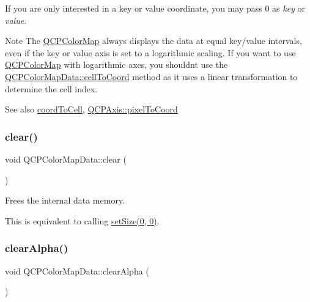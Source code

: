 If you are only interested in a key or value coordinate, you may pass 0 as {\itshape key} or {\itshape value}.

\begin{DoxyNote}{Note}
The \hyperlink{classQCPColorMap}{Q\+C\+P\+Color\+Map} always displays the data at equal key/value intervals, even if the key or value axis is set to a logarithmic scaling. If you want to use \hyperlink{classQCPColorMap}{Q\+C\+P\+Color\+Map} with logarithmic axes, you shouldn\textquotesingle{}t use the \hyperlink{classQCPColorMapData_af1a36385c78ab624cd617065602408b6}{Q\+C\+P\+Color\+Map\+Data\+::cell\+To\+Coord} method as it uses a linear transformation to determine the cell index.
\end{DoxyNote}
\begin{DoxySeeAlso}{See also}
\hyperlink{classQCPColorMapData_aca5b29e0ca2f299c9060fc6e1f74d0c8}{coord\+To\+Cell}, \hyperlink{classQCPAxis_a536ef8f624cac59b6b6fdcb495723c57}{Q\+C\+P\+Axis\+::pixel\+To\+Coord} 
\end{DoxySeeAlso}
\mbox{\label{classQCPColorMapData_a9910ba830e96955bd5c8e5bef1e77ef3}} 
\subsubsection{\texorpdfstring{clear()}{clear()}}
{\footnotesize\ttfamily void Q\+C\+P\+Color\+Map\+Data\+::clear (\begin{DoxyParamCaption}{ }\end{DoxyParamCaption})}

Frees the internal data memory.

This is equivalent to calling \hyperlink{classQCPColorMapData_a0d9ff35c299d0478b682bfbcdd9c097e}{set\+Size(0, 0)}. \mbox{\label{classQCPColorMapData_a14d08b9c3720cd719400079b86d3906b}} 
\subsubsection{\texorpdfstring{clear\+Alpha()}{clearAlpha()}}
{\footnotesize\ttfamily void Q\+C\+P\+Color\+Map\+Data\+::clear\+Alpha (\begin{DoxyParamCaption}{ }\end{DoxyParamCaption})}

